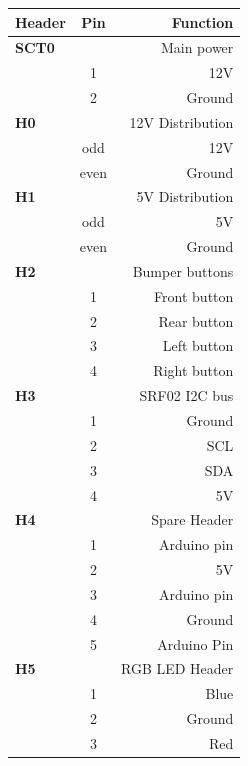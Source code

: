 \documentclass[technical_document.tex]{subfiles}
\begin{document}
\begin{table}[ht!]
\begin{minipage}[b]{0.5\linewidth}
  \begin{tabular}{| l | c | r |}
    \hline
    {\bf Header} 		& 		{\bf Pin} 		& 	{\bf Function} 		\\ \hline
    {\bf SCT0} 		& 	 				&  	Main power 		\\ \hline
     				&		1 			&	12V				\\ \hline
     				&		2 			& 	Ground 			\\ \hline
   {\bf H0} 			&	 				& 	12V Distribution 	\\ \hline
     	 			& 		odd 			&	12V 				\\ \hline
    	 			&		even	 		&	Ground 			\\ \hline
   {\bf H1}	 		&	 				&	5V Distribution 		\\ \hline
    				& 		odd 			&	5V				\\ \hline
    	 			&		even 		&	Ground 			\\ \hline
   {\bf H2}	 		&	 				&	Bumper buttons 	\\ \hline 
   				&		1			&       Front button		\\ \hline
				&		2			&	Rear	 button		\\ \hline
				&		3			&	Left button		\\ \hline
				&		4			&	Right button		\\ \hline
  {\bf H3}	 		&	 				&	SRF02 I2C bus 	\\ \hline 
   				&		1			&       Ground			\\ \hline
				&		2			&	SCL				\\ \hline
				&		3			&	SDA				\\ \hline
				&		4			&	5V				\\ \hline
 {\bf H4}	 		&	 				&	Spare Header		\\ \hline 
   				&		1			&       Arduino pin		\\ \hline
				&		2			&	5V				\\ \hline
				&		3			&	Arduino pin		\\ \hline
				&		4			&	Ground			\\ \hline
				&		5			&	Arduino Pin		\\ \hline
{\bf H5}	 		&	 				&	RGB LED Header	\\ \hline 
   				&		1			&       Blue				\\ \hline
				&		2			&	Ground			\\ \hline
				&		3			&	Red 				\\ \hline

\end{tabular}
\end{minipage}
\end{table}
\end{document}

